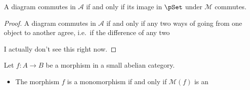\documentclass[main.tex]{subfiles}
\begin{document}
\begin{corollary}
  A diagram commutes in $\mathcal{A}$ if and only if its image in $\pSet$ under $\mathcal{M}$ commutes.
\end{corollary}
\begin{proof}
  A diagram commutes in $\mathcal{A}$ if and only if any two ways of going from one object to another agree, i.e.\ if the difference of any two

  I actually don't see this right now.
\end{proof}

\begin{lemma}
  \label{lemma:member_functor_preserves_mono_epi}
  Let $f\colon A \to B$ be a morphism in a small abelian category.
  \begin{itemize}
    \item The morphism $f$ is a monomorphism if and only if $\mathcal{M}(f)$ is an
  \end{itemize}
\end{lemma}
\end{document}
